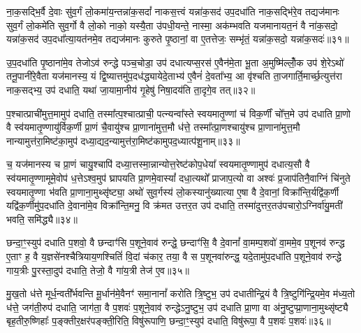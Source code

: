 {\anuvakamend[{यु॒क्तग्रा॑वा प्र॒जा मि॑थु॒न्य॑न्तरि॑क्ष॒न्द्वाद॑श च॥६॥}]}

ना॒क॒सद्भि॒र्वै दे॒वाः सु॑व॒र्गं लो॒कमा॑य॒न्तन्ना॑क॒सदां᳚ नाकस॒त्त्वं यन्ना॑क॒सद॑ उप॒दधा॑ति नाक॒सद्भि॑रे॒व तद्यज॑मानः सुव॒र्गं लो॒कमे॑ति सुव॒र्गो वै लो॒को नाको॒ यस्यै॒ता उ॑पधी॒यन्ते॒ नास्मा॒ अक॑म्भवति यजमानायत॒नं वै ना॑क॒सदो॒ यन्ना॑क॒सद॑ उप॒दधा᳚त्या॒यत॑नमे॒व तद्यज॑मानः कुरुते पृ॒ष्ठानां॒ वा ए॒तत्तेजः॒ सम्भृ॑तं॒ यन्ना॑क॒सदो॒ यन्ना॑क॒सदः॑॥३१॥

उ॒प॒दधा॑ति पृ॒ष्ठाना॑मे॒व तेजो\-ऽव॑ रुन्द्धे पञ्च॒चोडा॒ उप॑ दधात्यप्स॒रस॑ ए॒वैन॑मे॒ता भू॒ता अ॒मुष्मि॑ल्लोँ॒क उप॑ शे॒रे\-ऽथो॑ तनू॒पानी॑रे॒वैता यज॑मानस्य॒ यं द्वि॒ष्यात्तमु॑प॒दध॑द्ध्यायेदे॒ताभ्य॑ ए॒वैनं॑ दे॒वता᳚भ्य॒ आ वृ॑श्चति ता॒जगार्ति॒मार्च्छ॒त्युत्त॑रा नाक॒सद्भ्य॒ उप॑ दधाति॒ यथा॑ जा॒यामा॒नीय॑ गृ॒हेषु॑ निषा॒दय॑ति ता॒दृगे॒व तत्॥३२॥

प॒श्चात्प्राची॑मुत्त॒मामुप॑ दधाति॒ तस्मा᳚त्प॒श्चात्प्राची॒ पत्न्यन्वा᳚स्ते स्वयमातृ॒ण्णां च॑ विक॒र्णीं चो᳚त्त॒मे उप॑ दधाति प्रा॒णो वै स्व॑यमातृ॒ण्णायु॑र्विक॒र्णी प्रा॒णं चै॒वायु॑श्च प्रा॒णाना॑मुत्त॒मौ ध॑त्ते॒ तस्मा᳚त्प्रा॒णश्चायु॑श्च प्रा॒णाना॑मुत्त॒मौ नान्यामुत्त॑रा॒मिष्ट॑का॒मुप॑ दध्या॒द्यद॒न्यामुत्त॑रा॒मिष्ट॑कामुपद॒ध्यात्प॑शू॒नाम्॥३३॥

च॒ यज॑मानस्य च प्रा॒णं चायु॒श्चापि॑ दध्या॒त्तस्मा॒न्नान्योत्त॒रेष्ट॑कोप॒धेया᳚ स्वयमातृ॒ण्णामुप॑ दधात्य॒सौ वै स्व॑यमातृ॒ण्णामूमे॒वोप॑ ध॒त्ते\-ऽश्व॒मुप॑ घ्रापयति प्रा॒णमे॒वास्यां᳚ दधा॒त्यथो᳚ प्राजाप॒त्यो वा अश्वः॑ प्र॒जाप॑तिनै॒वाग्निं चि॑नुते स्वयमातृ॒ण्णा भ॑वति प्रा॒णाना॒मुथ्सृ॑ष्ट्या॒ अथो॑ सुव॒र्गस्य॑ लो॒कस्यानु॑ख्यात्या ए॒षा वै दे॒वानां॒ विक्रा᳚न्ति॒र्यद्वि॑क॒र्णी यद्वि॑क॒र्णीमु॑प॒दधा॑ति दे॒वाना॑मे॒व विक्रा᳚न्ति॒मनु॒ वि क्र॑मत उत्तर॒त उप॑ दधाति॒ तस्मा॑दुत्तर॒तउ॑पचारो॒\-ऽग्निर्वा॑यु॒मती॑ भवति॒ समि॑द्ध्यै॥३४॥

{\anuvakamend[{सम्भृ॑तं॒ यन्ना॑क॒सदो॒ यन्ना॑क॒सद॒स्तत्प॑शू॒नामे॒षां वै द्वाविꣳ॑शतिश्च॥७॥}]}

छन्दा॒ꣳ॒स्युप॑ दधाति प॒शवो॒ वै छन्दाꣳ॑सि प॒शूने॒वाव॑ रुन्द्धे॒ छन्दाꣳ॑सि॒ वै दे॒वानां᳚ वा॒मम्प॒शवो॑ वा॒ममे॒व प॒शूनव॑ रुन्द्ध ए॒ताꣳ ह॒ वै य॒ज्ञसे॑नश्चैत्रियाय॒णश्चितिं॑ वि॒दां च॑कार॒ तया॒ वै स प॒शूनवा॑रुन्द्ध॒ यदे॒तामु॑प॒दधा॑ति प॒शूने॒वाव॑ रुन्द्धे गाय॒त्रीः पु॒रस्ता॒दुप॑ दधाति॒ तेजो॒ वै गा॑य॒त्री तेज॑ ए॒व॥३५॥

मु॒ख॒तो ध॑त्ते मूर्ध॒न्वती᳚र्भवन्ति मू॒र्धान॑मे॒वैनꣳ॑ समा॒नानां᳚ करोति त्रि॒ष्टुभ॒ उप॑ दधातीन्द्रि॒यं वै त्रि॒ष्टुगि॑न्द्रि॒यमे॒व म॑ध्य॒तो ध॑त्ते॒ जग॑ती॒रुप॑ दधाति॒ जाग॑ता॒ वै प॒शवः॑ प॒शूने॒वाव॑ रुन्द्धे\-ऽनु॒ष्टुभ॒ उप॑ दधाति प्रा॒णा वा अ॑नु॒ष्टुप्प्रा॒णाना॒मुथ्सृ॑ष्ट्यै बृह॒तीरु॒ष्णिहाः᳚ प॒ङ्क्तीर॒क्षर॑पङ्क्ती॒रिति॒ विषु॑रूपाणि॒ छन्दा॒ꣳ॒स्युप॑ दधाति॒ विषु॑रूपा॒ वै प॒शवः॑ प॒शवः॑॥३६॥

